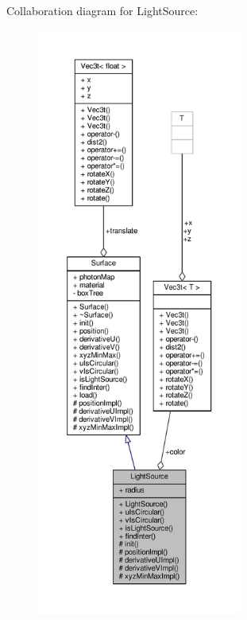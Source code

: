 Collaboration diagram for Light\+Source\+:\nopagebreak
\begin{figure}[H]
\begin{center}
\leavevmode
\includegraphics[height=550pt]{classLightSource__coll__graph}
\end{center}
\end{figure}
